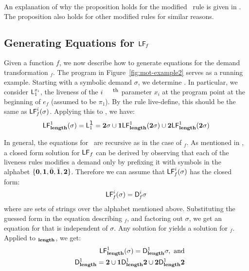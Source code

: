 \documentclass[preprint,9pt]{sigplanconf}
\begin{document}
An  explanation of  why the  proposition holds  for the
modified  \CONS\ rule  is  given in  \cite{asati14lgc}.
The proposition also holds for other modified rules for
similar reasons.


\subsection{Generating Equations for $\mathsf{LF}_{\mathit f}$}
Given a  function $\mathit{f}$, we now  describe how to
generate  equations   for  the   demand  transformation
\Lfonly$_\mathit{f}$.        The       program       in
Figure~\ref{fig:mot-example2}   serves  as   a  running
example.  Starting with a  symbolic demand $\sigma$, we
determine  .   In
particular, we  consider $\mathsf{L}_{{1}}^{x_i}$,  the liveness
of the $i^{\mbox{\footnotesize th}}$ parameter $x_i$ at
the program point at  the beginning of $e_{\mathit{f}}$
(assumed   to   be   $\pi_1$).   By   the   rule   {\sc
  live-define},   this   should    be   the   same   as
$\mathsf{LF}_{\mathit f}^{i}( {\mathit \sigma})$. Applying this to \length, we have:
$$
 \mathsf{LF}_{\mathit {\mathbf{length}}}^{1}( {\mathit \sigma}) = \mathsf{L}_{{1}}^{\mbox{\tt l}} = {\mathbf{2}}\sigma \cup \mathbf{1}\mathsf{LF}_{\mathit {\mathbf{length}}}^{1}( {\mathit {{\mathbf{2}}}\sigma})
  \cup {\mathbf{2}}\mathsf{LF}_{\mathit {\mathbf{length}}}^{1}( {\mathit {{\mathbf{2}}}\sigma})
$$

In general, the equations for \Lfonly\ are recursive as
in the  case of  \Lfonly$_\mathit{f}$. As  mentioned in
\cite{asati14lgc},   a   closed   form   solution   for
$\mathsf{LF}_{\mathit \mathit{f}}$ can  be derived by  observing that
each of  the liveness rules  modifies a demand  only by
prefixing  it with  symbols  in  the alphabet  $\lbrace
\mathbf{0}, \mathbf{1},\bar{\mathbf{0}},  \bar{\mathbf{1}}, {\mathbf{2}}  \rbrace$. Therefore
we can  assume that $\mathsf{LF}_{\mathit f}^{i}( {\mathit \sigma})$ has  the closed
form:
\begin{eqnarray}
\label{eq:LF:DI}
  \mathsf{LF}_{\mathit f}^{i}( {\mathit \sigma}) = \mathsf{D}_{\mathit f}^{i}\sigma
\end{eqnarray}
where   are sets of strings  over the alphabet
mentioned above.  Substituting the  guessed form in the
equation   describing    \Lfonly$_{\mathit   f}$,   and
factoring  out   $\sigma$,  we  get  an   equation  for
  that   is  independent  of   $\sigma$.   Any
solution   for      yields  a   solution   for
\Lfonly$_{\mathit  f}$.   Applied to  \Lfonly$_{\mathit
  {\mathbf{length}}}$, we get:
  \begin{eqnarray*}
&&  \mathsf{LF}_{\mathit {\mathbf{length}} }^{1}( {\mathit \sigma}) = \mathsf{D}_{\mathit {\mathbf{length}}}^{1}\sigma,~\mbox{and}\\
&&   \mathsf{D}_{\mathit {\mathbf{length}}}^{1} = {\mathbf{2}} \cup \mathbf{1}\mathsf{D}_{\mathit {\mathbf{length}}}^{1}{\mathbf{2}}
       \cup {\mathbf{2}}\mathsf{D}_{\mathit {\mathbf{length}}}^{1}{{\mathbf{2}}}
  \end{eqnarray*}
\end{document}
